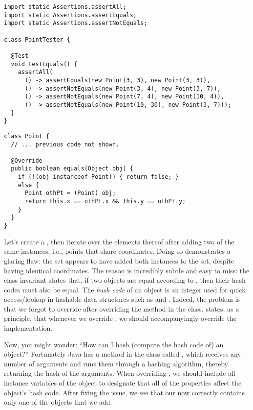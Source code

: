 \begin{lstlisting}[language=MyJava]
import static Assertions.assertAll;
import static Assertions.assertEquals;
import static Assertions.assertNotEquals;

class PointTester {

  @Test
  void testEquals() {
    assertAll(
      () -> assertEquals(new Point(3, 3), new Point(3, 3)),
      () -> assertNotEquals(new Point(3, 4), new Point(3, 7)),
      () -> assertNotEquals(new Point(7, 4), new Point(10, 4)),
      () -> assertNotEquals(new Point(10, 30), new Point(3, 7)));
  }
}
\end{lstlisting}

\begin{lstlisting}[language=MyJava]
class Point {
  // ... previous code not shown.

  @Override
  public boolean equals(Object obj) {
    if (!(obj instanceof Point)) { return false; }
    else {
      Point othPt = (Point) obj;
      return this.x == othPt.x && this.y == othPt.y;
    }
  }
}
\end{lstlisting}

Let's create a , then iterate over the elements thereof after adding two of the same  instances, i.e., points that share coordinates. 
Doing so demonstrates a glaring flaw: the set appears to have added both  instances to the set, despite having identical coordinates. 
The reason is incredibly subtle and easy to miss: the  class invariant states that, if two objects are equal according to , then their hash codes must also be equal. 
The \emph{hash code} of an object is an integer used for quick access/lookup in hashable data structures such as  and . 
Indeed, the problem is that we forgot to override  after overriding the  method in the  class. 
 states, as a principle, that whenever we override , we should accompanyingly override the  implementation. 

Now, you might wonder: ``How can I hash (compute the hash code of) an object?'' 
Fortunately Java has a method in the  class called , which receives any number of arguments and runs them through a hashing algorithm, thereby returning the hash of the arguments. 
When overriding , we should include all instance variables of the object to designate that all of the properties affect the object's hash code. 
After fixing the issue, we see that our  now correctly contains only one of the  objects that we add.

